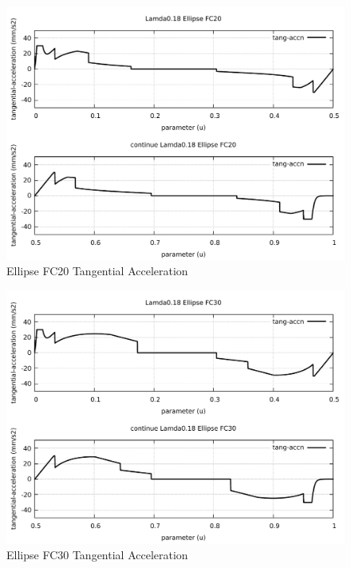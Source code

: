 \begin{figure}
	\caption     {Ellipse FC20 Tangential Acceleration}
	\label{22-img-Ellipse-FC20-Tangential-Acceleration.pdf}
	\includegraphics[width=1.00\textwidth]{Chap4/appendix/app-Ellipse/plots/22-img-Ellipse-FC20-Tangential-Acceleration.pdf}
\end{figure}

\clearpage
\pagebreak

\begin{figure}
	\caption     {Ellipse FC30 Tangential Acceleration}
	\label{23-img-Ellipse-FC30-Tangential-Acceleration.pdf}
	\includegraphics[width=1.00\textwidth]{Chap4/appendix/app-Ellipse/plots/23-img-Ellipse-FC30-Tangential-Acceleration.pdf}
\end{figure}


